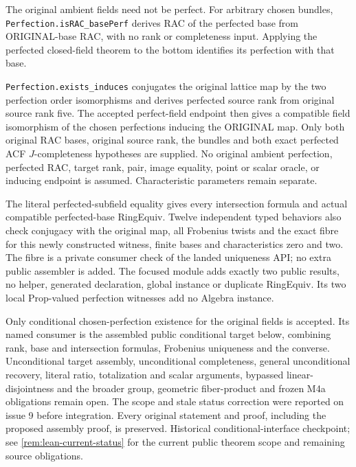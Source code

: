 \documentclass[11pt,oneside]{article}
\theoremstyle{definition}
\theoremstyle{remark}
\newcommand{\lean}[1]{\nolinkurl{#1}}
\begin{document}
The original ambient fields need not be perfect. For arbitrary chosen bundles,
\lean{Perfection.isRAC_basePerf} derives RAC of the perfected base from
ORIGINAL-base RAC, with no rank or completeness input. Applying the perfected
closed-field theorem to the bottom identifies its perfection with that base.

\lean{Perfection.exists_induces} conjugates the original lattice map by the two
perfection order isomorphisms and derives perfected source rank from original
source rank five. The accepted perfect-field endpoint then gives a compatible
field isomorphism of the chosen perfections inducing the ORIGINAL map.
Only both original RAC bases, original source rank, the bundles and both exact
perfected ACF $J$-completeness hypotheses are supplied. No original ambient
perfection, perfected RAC, target rank, pair, image equality, point or scalar
oracle, or inducing endpoint is assumed. Characteristic parameters remain separate.

The literal perfected-subfield equality gives every intersection formula and
actual compatible perfected-base RingEquiv. Twelve independent typed behaviors
also check conjugacy with the original map, all Frobenius twists and the exact
fibre for this newly constructed witness, finite bases and characteristics
zero and two. The fibre is a private consumer check of the landed uniqueness
API; no extra public assembler is added. The focused module adds exactly two
public results, no helper, generated declaration, global instance or duplicate
RingEquiv. Its two local Prop-valued perfection witnesses add no Algebra instance.

Only conditional chosen-perfection existence for the original fields is accepted.
Its named consumer is the assembled public conditional target below, combining rank,
base and intersection formulas, Frobenius uniqueness and the converse. Unconditional
target assembly, unconditional completeness, general unconditional recovery,
literal ratio, totalization and scalar arguments, bypassed linear-disjointness
and the broader group, geometric fiber-product and frozen M4a obligations remain open.
The scope and stale status correction were reported on issue 9 before integration.
Every original statement and proof, including the proposed assembly proof, is preserved.
Historical conditional-interface checkpoint; see \cref{rem:lean-current-status} for
the current public theorem scope and remaining source obligations.
\end{document}
